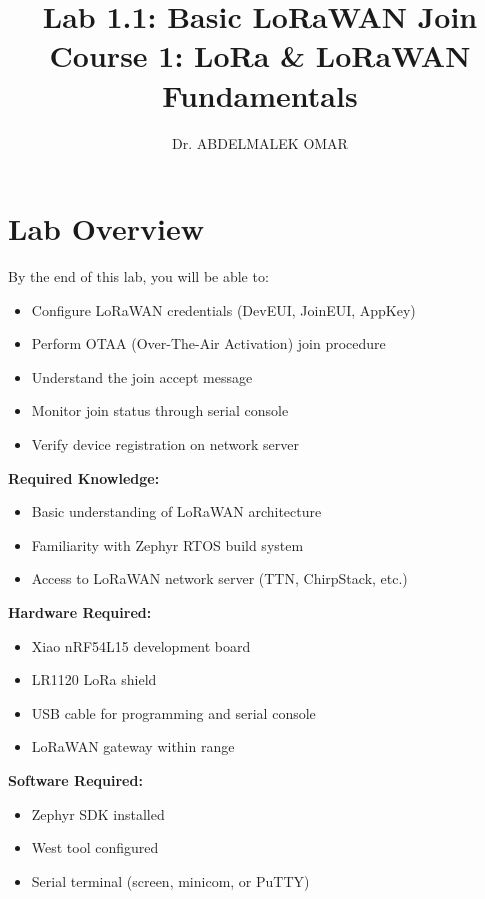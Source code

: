 \documentclass[11pt,a4paper]{article}
\title{
    \textbf{Lab 1.1: Basic LoRaWAN Join}\\
    \large Course 1: LoRa \& LoRaWAN Fundamentals
}
\author{Dr. ABDELMALEK OMAR}
\date{}
\begin{document}
\maketitle
\thispagestyle{fancy}

\section{Lab Overview}

\begin{objectivebox}
By the end of this lab, you will be able to:
\begin{itemize}
    \item Configure LoRaWAN credentials (DevEUI, JoinEUI, AppKey)
    \item Perform OTAA (Over-The-Air Activation) join procedure
    \item Understand the join accept message
    \item Monitor join status through serial console
    \item Verify device registration on network server
\end{itemize}
\end{objectivebox}

\vspace{0.5cm}

\begin{prereqbox}
\textbf{Required Knowledge:}
\begin{itemize}
    \item Basic understanding of LoRaWAN architecture
    \item Familiarity with Zephyr RTOS build system
    \item Access to LoRaWAN network server (TTN, ChirpStack, etc.)
\end{itemize}

\vspace{0.3cm}

\textbf{Hardware Required:}
\begin{itemize}
    \item Xiao nRF54L15 development board
    \item LR1120 LoRa shield
    \item USB cable for programming and serial console
    \item LoRaWAN gateway within range
\end{itemize}

\vspace{0.3cm}

\textbf{Software Required:}
\begin{itemize}
    \item Zephyr SDK installed
    \item West tool configured
    \item Serial terminal (screen, minicom, or PuTTY)
\end{itemize}
\end{prereqbox}
\end{document}
